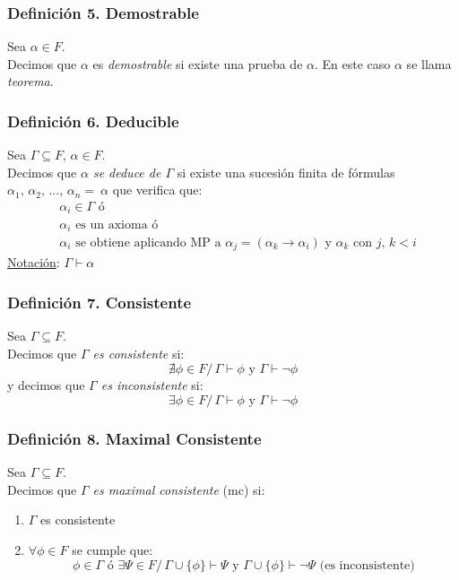 \documentclass{article}
\newcommand{\comma}{,\,}                                %
\newcommand{\tq}{/\,}                                   %
\begin{document}
\subsubsection*{Definición 5. Demostrable}
Sea $\alpha \in F$.
\\Decimos que $\alpha$ es \emph{demostrable} si existe una prueba de $\alpha$. En este caso $\alpha$ se llama \emph{teorema}.

\subsubsection*{Definición 6. Deducible}
Sea $\Gamma \subseteq F \comma \alpha \in F$.
\\Decimos que \emph{$\alpha$ se deduce de $\Gamma$} si existe una sucesión finita de fórmulas  $\alpha_1\comma \alpha_2 \comma ... \comma \alpha_n =~\alpha$ que verifica que:
\begin{align*}
    &\alpha_i \in \Gamma \text{ ó}\\
    &\alpha_i \text{ es un axioma ó}\\
    &\alpha_i \text{ se obtiene aplicando MP a } \alpha_j = (\alpha_k \rightarrow \alpha_i) \text{ y } \alpha_k \text{ con } j \comma k < i
\end{align*}
\underline{Notación}: $\Gamma \vdash \alpha$

\subsubsection*{Definición 7. Consistente}
Sea $\Gamma \subseteq F$.
\\Decimos que \emph{$\Gamma$ es consistente} si:
\begin{equation*}
    \nexists \phi \in F \tq \Gamma \vdash \phi \text{ y } \Gamma \vdash \neg \phi
\end{equation*}
y decimos que \emph{$\Gamma$ es inconsistente} si:
\begin{equation*}
    \exists \phi \in F \tq \Gamma \vdash \phi \text{ y } \Gamma \vdash \neg \phi
\end{equation*}

\subsubsection*{Definición 8. Maximal Consistente}
Sea $\Gamma \subseteq F$.
\\Decimos que \emph{$\Gamma$ es maximal consistente} (mc) si:
\begin{enumerate}
    \item $\Gamma$ es consistente
    \item $\forall \phi \in F$ se cumple que:
    \begin{equation*}
        \phi \in \Gamma \text{ ó } \exists \Psi \in F \tq \Gamma \cup \{\phi\} \vdash \Psi \text{ y } \Gamma \cup \{\phi\} \vdash \neg \Psi \text{ (es inconsistente)}
    \end{equation*}
\end{enumerate}
\end{document}
